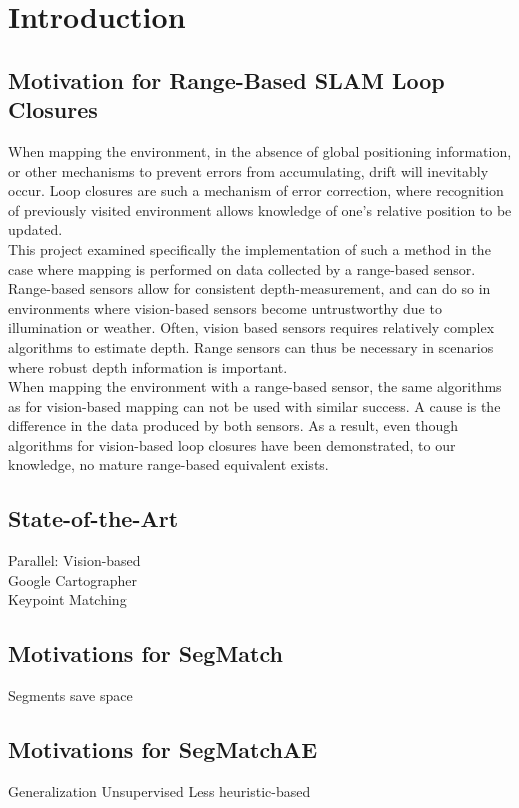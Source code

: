\chapter{Introduction}
\label{sec:introduction}

\section{Motivation for Range-Based SLAM Loop Closures}
\label{sec:motivation}

When mapping the environment, in the absence of global positioning information, or other mechanisms to prevent errors from accumulating, drift will inevitably occur. Loop closures are such a mechanism of error correction, where recognition of previously visited environment allows knowledge of one's relative position to be updated.\\ 

This project examined specifically the implementation of such a method in the case where mapping is performed on data collected by a range-based sensor.\\

Range-based sensors allow for consistent depth-measurement, and can do so in environments where vision-based sensors become untrustworthy due to illumination or weather. Often, vision based sensors requires relatively complex algorithms to estimate depth. Range sensors can thus be necessary in scenarios where robust depth information is important.\\

When mapping the environment with a range-based sensor, the same algorithms as for vision-based mapping can not be used with similar success. A cause is the difference in the data produced by both sensors. As a result, even though algorithms for vision-based loop closures have been demonstrated, to our knowledge, no mature range-based equivalent exists.\\

\section{State-of-the-Art}
\label{sec:SOTA}

Parallel: Vision-based\\
Google Cartographer\\
Keypoint Matching\\

\section{Motivations for SegMatch}

Segments save space

\section{Motivations for SegMatchAE}

Generalization
Unsupervised
Less heuristic-based

